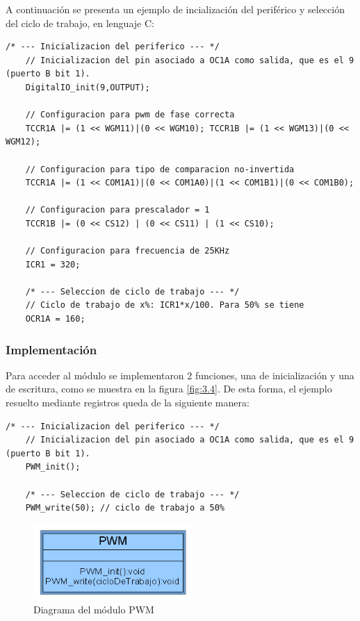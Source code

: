 A continuación se presenta un ejemplo de incialización del periférico y selección del ciclo de trabajo, en lenguaje C: 
\begin{lstlisting}[style=CStyle]
	/* --- Inicializacion del periferico --- */
	// Inicializacion del pin asociado a OC1A como salida, que es el 9 (puerto B bit 1).
	DigitalIO_init(9,OUTPUT);
	
	// Configuracion para pwm de fase correcta
	TCCR1A |= (1 << WGM11)|(0 << WGM10); TCCR1B |= (1 << WGM13)|(0 << WGM12);
	
	// Configuracion para tipo de comparacion no-invertida
	TCCR1A |= (1 << COM1A1)|(0 << COM1A0)|(1 << COM1B1)|(0 << COM1B0);
	
	// Configuracion para prescalador = 1
	TCCR1B |= (0 << CS12) | (0 << CS11) | (1 << CS10);
	
	// Configuracion para frecuencia de 25KHz
	ICR1 = 320;
	
	/* --- Seleccion de ciclo de trabajo --- */
	// Ciclo de trabajo de x%: ICR1*x/100. Para 50% se tiene
	OCR1A = 160;
\end{lstlisting}

\subsubsection{Implementación}

Para acceder al módulo se implementaron 2 funciones, una de inicialización y una de escritura, como se muestra en la figura \ref{fig:3.4}. De esta forma, el ejemplo resuelto mediante registros queda de la siguiente manera:

\begin{lstlisting}[style=CStyle]
	/* --- Inicializacion del periferico --- */
	// Inicializacion del pin asociado a OC1A como salida, que es el 9 (puerto B bit 1).
	PWM_init();
	
	/* --- Seleccion de ciclo de trabajo --- */
	PWM_write(50); // ciclo de trabajo a 50%
\end{lstlisting}


\begin{figure}[!ht]
	\centering
	\includegraphics[width=6cm,scale=1]{resources/3_4-moduloPWM.png}
	\caption{Diagrama del módulo PWM}
	\label{fig:\thefigure}
\end{figure}

